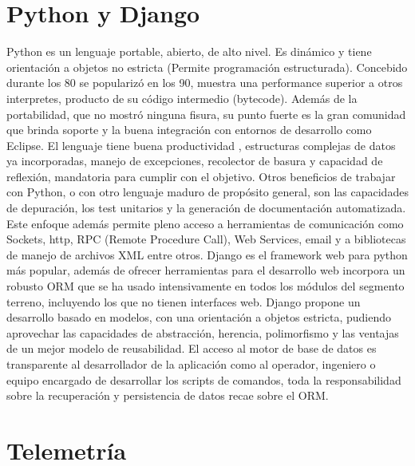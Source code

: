 \documentclass[twoside,twocolumn]{article}
\begin{document}
\section{Python y Django}

Python es un lenguaje portable, abierto, de alto nivel. Es dinámico y tiene 
orientación a objetos no estricta (Permite programación estructurada). 
Concebido durante los 80 se popularizó en los 90, muestra una performance 
superior a otros interpretes, producto de su código intermedio (bytecode). 
Además de la portabilidad, que no mostró ninguna fisura, su punto fuerte es la 
gran comunidad que brinda soporte y la buena integración con entornos de 
desarrollo como Eclipse.  El lenguaje tiene buena productividad 
\cite{prechelt2000empirical}, estructuras complejas de datos ya incorporadas, 
manejo de excepciones, recolector de basura y capacidad de reflexión, mandatoria 
para cumplir con el objetivo. Otros beneficios de trabajar con Python, o con 
otro lenguaje maduro de propósito general, son las capacidades de depuración, 
los test unitarios y la generación de documentación automatizada. Este enfoque 
además permite pleno acceso a herramientas de comunicación como Sockets, http, 
RPC (Remote Procedure Call), Web Services, email y a bibliotecas de manejo de 
archivos XML entre otros. 
Django es el framework web para python más popular, además de ofrecer 
herramientas para el desarrollo web incorpora un robusto ORM que se ha usado 
intensivamente en todos los módulos del segmento terreno, incluyendo los que no 
tienen interfaces web. Django propone un desarrollo basado en modelos, con una 
orientación a objetos estricta, pudiendo aprovechar las capacidades de 
abstracción, herencia, polimorfismo y las ventajas de un mejor modelo de 
reusabilidad. El acceso al motor de base de datos es transparente al 
desarrollador de la aplicación como al operador, ingeniero o equipo encargado 
de desarrollar los scripts de comandos, toda la responsabilidad sobre la 
recuperación y persistencia de datos recae sobre el ORM.  


\section{Telemetría}
\label{sec:telemetria}
\end{document}
